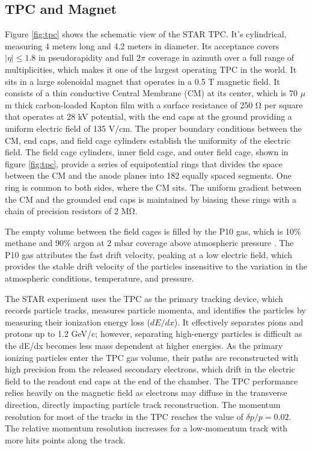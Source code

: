 \subsection{TPC and Magnet}
\label{subsec:tpc}
Figure \ref{fig:tpc} shows the schematic view of the STAR TPC. It's cylindrical, measuring 4 meters long and 4.2 meters in diameter. Its acceptance covers $|\eta|\leq 1.8$ in pseudorapidity and full $2\pi$ coverage in azimuth over a full range of multiplicities, which makes it one of the largest operating TPC in the world. It sits in a large solenoidal magnet that operates in a 0.5 T magnetic field. It consists of a thin conductive Central Membrane (CM) at its center, which is 70 $\mu$m thick carbon-loaded Kapton film with a surface resistance of 250 \si{\ohm} per square that operates at 28 kV potential, with the end caps at the ground  providing a uniform electric field of 135 V/cm. The proper boundary conditions between the CM, end caps, and field cage cylinders establish the uniformity of the electric field. The field cage cylinders, inner field cage, and outer field cage, shown in figure \ref{fig:tpc}, provide a series of equipotential rings that divides the space between the CM and the anode planes into 182 equally spaced segments. One ring is common to both sides, where the CM sits. The uniform gradient between the CM and the grounded end caps is maintained by biasing these rings with a chain of precision resistors  of 2 M\si{\ohm}.


The empty volume between the field cages is filled by the P10 gas, which is 10\% methane and 90\% argon at 2 mbar coverage above atmospheric pressure \cite{Kotchenda:2002rqz}. The P10 gas attributes the fast drift velocity, peaking at a low electric field, which provides the stable drift velocity of the particles insensitive to the variation in the atmospheric conditions, temperature, and pressure.  

The STAR experiment uses the TPC as the primary tracking device, which records particle tracks, measures particle momenta, and identifies the particles by measuring their ionization energy loss ($dE/dx$). It effectively separates pions and protons up to 1.2 GeV/c; however, separating high-energy particles is difficult as the dE/dx becomes less mass dependent at higher energies. As the primary ionizing particles enter the TPC gas volume, their paths are reconstructed with high precision from the released secondary electrons, which drift in the electric field to the readout end caps at the end of the chamber. The TPC performance relies heavily on the magnetic field as electrons may diffuse in the transverse direction, directly impacting particle track reconstruction. The momentum resolution for most of the tracks in the TPC reaches the value of $\delta p/p = 0.02$. The relative momentum resolution increases for a low-momentum track with more hits points along the track. 


